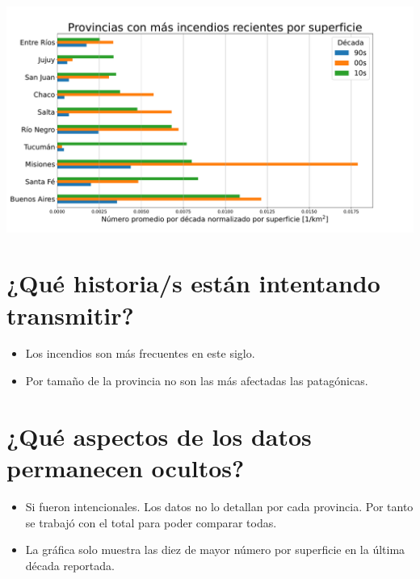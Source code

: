 \documentclass[12pt, spanish, a4paper, landscape]{article}
\begin{document}

\begin{center}
  \includegraphics*[width= 1.1\textwidth]{./top10_10s}
\end{center}

\newpage
\section*{¿Qué historia/s están intentando transmitir?}
\begin{itemize}
  \item Los incendios son más frecuentes en este siglo.
  \item Por tamaño de la provincia no son las más afectadas las patagónicas.
\end{itemize}


\section*{¿Qué aspectos de los datos permanecen ocultos?}
\begin{itemize}
  \item Si fueron intencionales. Los datos no lo detallan por cada provincia. Por tanto se trabajó con el total para poder comparar todas.
  \item La gráfica solo muestra las diez de mayor número por superficie en la última década reportada.
\end{itemize}


\end{document}
